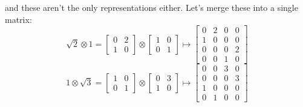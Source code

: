 \documentclass[12pt]{article}
\begin{document}
and these aren't the only representations either.  Let's merge these into a single matrix:
$$ \sqrt{2} \otimes 1  =
\left[\begin{array}{cc} 0 & 2 \\ 1 & 0\end{array} \right] \otimes \left[\begin{array}{cc} 1 & 0 \\ 0 & 1\end{array} \right] \mapsto 
\left[
\begin{array}{cc|cc} 0 & 2 & 0 & 0 \\ 1 & 0 & 0 & 0\\ \hline
0 & 0 & 0 & 2 \\ 0 & 0 & 1 & 0\end{array} \right]
$$
$$ 1 \otimes \sqrt{3}   =
\left[\begin{array}{cc} 1 & 0 \\ 0 & 1\end{array} \right] \otimes
\left[\begin{array}{cc} 0 & 3 \\ 1 & 0\end{array} \right]   \mapsto 
\left[
\begin{array}{cc|cc} 0 & 0 & 3 & 0 \\ 0 & 0 & 0 & 3 \\ \hline
1 & 0 & 0 & 0 \\ 0 & 1 & 0 & 0\end{array} \right]
$$
\newpage
\end{document}

